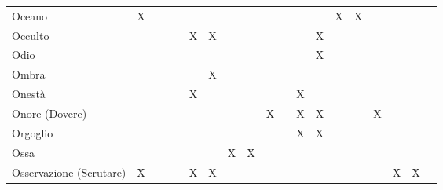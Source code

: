 \documentclass[10pt,a3paper]{memoir}
\begin{document}
\begin{table}[h]
\begin{tabular}{l|c|c|c|c|c|c|c|c|c|c|c|c|c|c|c|c|c|c}
Oceano & X &  &  &  &  &  &  &  &  &  &  &  & X & X &  &  &  &  \\
Occulto &  &  &  &  & X & X &  &  &  &  &  & X &  &  &  &  &  &  \\
Odio &  &  &  &  &  &  &  &  &  &  &  & X &  &  &  &  &  &  \\
Ombra &  &  &  &  &  & X &  &  &  &  &  &  &  &  &  &  &  &  \\
Onest\`{a} &  &  &  &  & X &  &  &  &  &  & X &  &  &  &  &  &  &  \\
Onore (Dovere) &  &  &  &  &  &  &  &  & X &  & X & X &  &  & X &  &  &  \\
Orgoglio &  &  &  &  &  &  &  &  &  &  & X & X &  &  &  &  &  &  \\
Ossa &  &  &  &  &  &  & X & X &  &  &  &  &  &  &  &  &  &  \\
Osservazione (Scrutare) & X &  &  &  & X & X &  &  &  &  &  &  &  &  &  & X & X &  \\
\bottomrule
\end{tabular}
\end{table}
\end{document}
